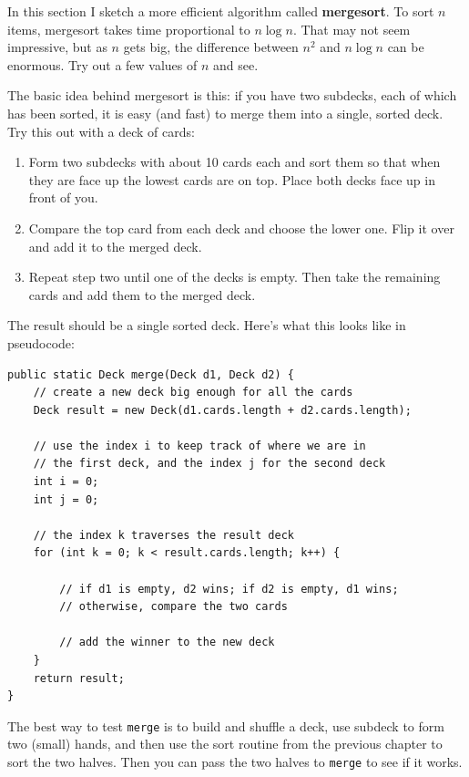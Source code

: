 \documentclass[12pt]{book}
\theoremstyle{exercise}
\begin{document}
In this section I sketch a more efficient algorithm called {\bf
mergesort}.  To sort $n$ items, mergesort takes time proportional to
$n \log n$.  That may not seem impressive, but as $n$ gets big, the
difference between $n^2$ and $n \log n$ can be enormous.  Try out a
few values of $n$ and see.

The basic idea behind mergesort is this: if you have two subdecks,
each of which has been sorted, it is easy (and fast) to merge them
into a single, sorted deck.  Try this out with a deck of cards:

\begin{enumerate}

\item Form two subdecks with about 10 cards each and sort
them so that when they are face up the lowest cards are on
top.  Place both decks face up in front of you.

\item Compare the top card from each deck and choose the
lower one.  Flip it over and add it to the merged deck.

\item Repeat step two until one of the decks is empty.
Then take the remaining cards and add them to the merged
deck.

\end{enumerate}

The result should be a single sorted deck.  Here's what this
looks like in pseudocode:

\begin{lstlisting}
public static Deck merge(Deck d1, Deck d2) {
    // create a new deck big enough for all the cards
    Deck result = new Deck(d1.cards.length + d2.cards.length);

    // use the index i to keep track of where we are in
    // the first deck, and the index j for the second deck
    int i = 0;
    int j = 0;

    // the index k traverses the result deck
    for (int k = 0; k < result.cards.length; k++) {

        // if d1 is empty, d2 wins; if d2 is empty, d1 wins;
        // otherwise, compare the two cards

        // add the winner to the new deck
    }
    return result;
}
\end{lstlisting}

The best way to test {\tt merge} is to build and shuffle a deck,
use subdeck to form two (small) hands, and then use the sort
routine from the previous chapter to sort the two halves.  Then
you can pass the two halves to {\tt merge} to see if it works.
\end{document}

